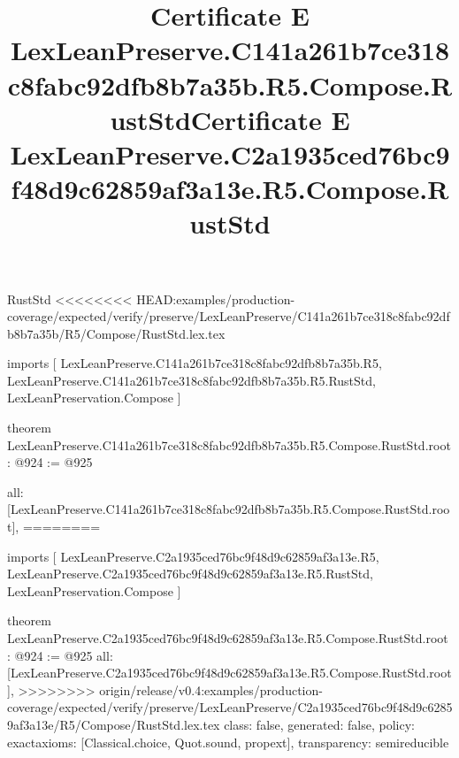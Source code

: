 \begin{lexlean}{RustStd}
<<<<<<<< HEAD:examples/production-coverage/expected/verify/preserve/LexLeanPreserve/C141a261b7ce318c8fabc92dfb8b7a35b/R5/Compose/RustStd.lex.tex
\title{Certificate E LexLeanPreserve.C141a261b7ce318c8fabc92dfb8b7a35b.R5.Compose.RustStd}
\begin{coremodule}
imports [
  LexLeanPreserve.C141a261b7ce318c8fabc92dfb8b7a35b.R5,
  LexLeanPreserve.C141a261b7ce318c8fabc92dfb8b7a35b.R5.RustStd,
  LexLeanPreservation.Compose
]

theorem LexLeanPreserve.C141a261b7ce318c8fabc92dfb8b7a35b.R5.Compose.RustStd.root : @924 := @925 {
  all: [LexLeanPreserve.C141a261b7ce318c8fabc92dfb8b7a35b.R5.Compose.RustStd.root],
========
\title{Certificate E LexLeanPreserve.C2a1935ced76bc9f48d9c62859af3a13e.R5.Compose.RustStd}
\begin{coremodule}
imports [
  LexLeanPreserve.C2a1935ced76bc9f48d9c62859af3a13e.R5,
  LexLeanPreserve.C2a1935ced76bc9f48d9c62859af3a13e.R5.RustStd,
  LexLeanPreservation.Compose
]

theorem LexLeanPreserve.C2a1935ced76bc9f48d9c62859af3a13e.R5.Compose.RustStd.root : @924 := @925 {
  all: [LexLeanPreserve.C2a1935ced76bc9f48d9c62859af3a13e.R5.Compose.RustStd.root],
>>>>>>>> origin/release/v0.4:examples/production-coverage/expected/verify/preserve/LexLeanPreserve/C2a1935ced76bc9f48d9c62859af3a13e/R5/Compose/RustStd.lex.tex
  class: false,
  generated: false,
  policy: exact{axioms: [Classical.choice, Quot.sound, propext]},
  transparency: semireducible
}


\end{coremodule}}
\end{coremodule}
\end{lexlean}
